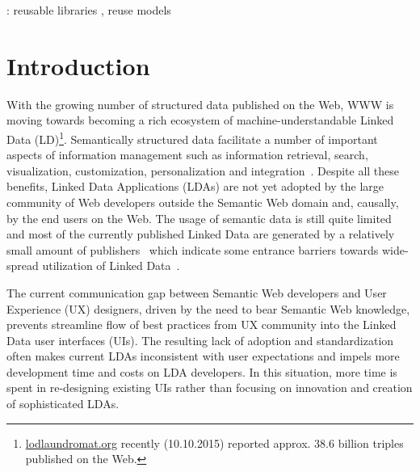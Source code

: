 \documentclass{acm_proc_article-sp}
\begin{document}
 {: reusable libraries} {, reuse models}



\section{Introduction}


With the growing number of structured data published on the Web, WWW is moving towards becoming a rich ecosystem of machine-understandable Linked Data (LD)\footnote{\url{lodlaundromat.org} recently (10.10.2015) reported approx. 38.6 billion triples published on the Web.}.
Semantically structured data facilitate a number of important aspects of
information management such as information retrieval, search, visualization,  customization, personalization and integration~\cite{SCAJ-Khalili-2013}.
Despite all these benefits, Linked Data Applications (LDAs) are not yet adopted by the large community of Web developers outside the Semantic Web domain and, causally, by the end users on the Web.
The usage of semantic data is still quite limited and most of the currently published Linked Data are generated by a relatively small amount of publishers~\cite{ontowiki-swj} which indicate some entrance barriers towards wide-spread utilization of Linked Data~\cite{Benson2014}.

The current communication gap between Semantic Web developers and User Experience (UX) designers, driven by the need to bear Semantic Web knowledge, prevents streamline flow of best practices from UX community into the Linked Data user interfaces (UIs).
The resulting lack of adoption and standardization often makes current LDAs inconsistent with user expectations and impels more development time and costs on LDA developers.
In this situation, more time is spent in re-designing existing UIs rather than focusing on innovation and creation of sophisticated LDAs.
 
\end{document}
